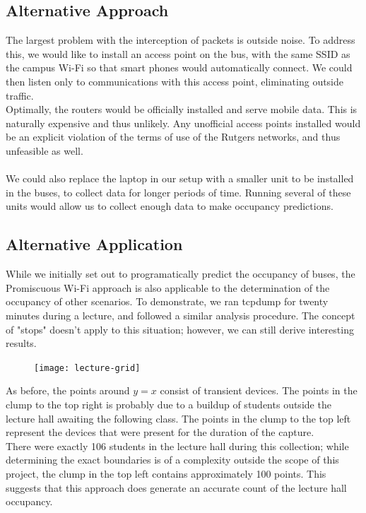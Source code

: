 \documentclass[11pt,journal,compsoc]{IEEEtran} %
\begin{document}
\subsection*{Alternative Approach}
	The largest problem with the interception of packets is outside noise.
	To address this, we would like to install an access point on the bus, with the same SSID as the campus Wi-Fi so that smart phones would automatically connect.
	We could then listen only to communications with this access point, eliminating outside traffic.
	\\
	Optimally, the routers would be officially installed and serve mobile data.
	This is naturally expensive and thus unlikely.
	Any unofficial access points installed would be an explicit violation of the terms of use of the Rutgers networks, and thus unfeasible as well.
	\\\\
	We could also replace the laptop in our setup with a smaller unit to be installed in the buses, to collect data for longer periods of time.
	Running several of these units would allow us to collect enough data to make occupancy predictions.

\subsection*{Alternative Application}
	While we initially set out to programatically predict the occupancy of buses, the Promiscuous Wi-Fi approach is also applicable to the determination of the occupancy of other scenarios.
	To demonstrate, we ran tcpdump for twenty minutes during a lecture, and followed a similar analysis procedure.
	The concept of "stops" doesn't apply to this situation; however, we can still derive interesting results.

	\begin{figure}[H]
		\texttt{[image: lecture-grid]}
		\end{figure}

	As before, the points around \(y=x\) consist of transient devices.
	The points in the clump to the top right is probably due to a buildup of students outside the lecture hall awaiting the following class.
	The points in the clump to the top left represent the devices that were present for the duration of the capture.
	\\
	There were exactly 106 students in the lecture hall during this collection; while determining the exact boundaries is of a complexity outside the scope of this project, the clump in the top left contains approximately 100 points.
	This suggests that this approach does generate an accurate count of the lecture hall occupancy.
\end{document}

